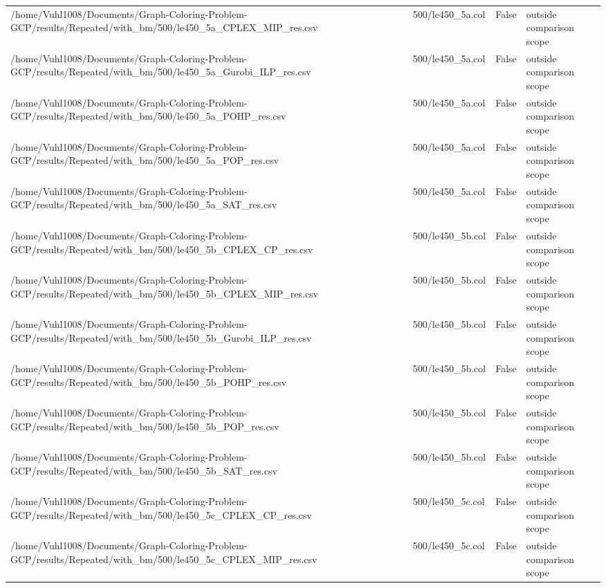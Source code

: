 \begin{table}[htbp]
\begin{tabular}{llll}
/home/Vuhl1008/Documents/Graph-Coloring-Problem-GCP/results/Repeated/with\_bm/500/le450\_5a\_CPLEX\_MIP\_res.csv & 500/le450\_5a.col & False & outside comparison scope \\
/home/Vuhl1008/Documents/Graph-Coloring-Problem-GCP/results/Repeated/with\_bm/500/le450\_5a\_Gurobi\_ILP\_res.csv & 500/le450\_5a.col & False & outside comparison scope \\
/home/Vuhl1008/Documents/Graph-Coloring-Problem-GCP/results/Repeated/with\_bm/500/le450\_5a\_POHP\_res.csv & 500/le450\_5a.col & False & outside comparison scope \\
/home/Vuhl1008/Documents/Graph-Coloring-Problem-GCP/results/Repeated/with\_bm/500/le450\_5a\_POP\_res.csv & 500/le450\_5a.col & False & outside comparison scope \\
/home/Vuhl1008/Documents/Graph-Coloring-Problem-GCP/results/Repeated/with\_bm/500/le450\_5a\_SAT\_res.csv & 500/le450\_5a.col & False & outside comparison scope \\
/home/Vuhl1008/Documents/Graph-Coloring-Problem-GCP/results/Repeated/with\_bm/500/le450\_5b\_CPLEX\_CP\_res.csv & 500/le450\_5b.col & False & outside comparison scope \\
/home/Vuhl1008/Documents/Graph-Coloring-Problem-GCP/results/Repeated/with\_bm/500/le450\_5b\_CPLEX\_MIP\_res.csv & 500/le450\_5b.col & False & outside comparison scope \\
/home/Vuhl1008/Documents/Graph-Coloring-Problem-GCP/results/Repeated/with\_bm/500/le450\_5b\_Gurobi\_ILP\_res.csv & 500/le450\_5b.col & False & outside comparison scope \\
/home/Vuhl1008/Documents/Graph-Coloring-Problem-GCP/results/Repeated/with\_bm/500/le450\_5b\_POHP\_res.csv & 500/le450\_5b.col & False & outside comparison scope \\
/home/Vuhl1008/Documents/Graph-Coloring-Problem-GCP/results/Repeated/with\_bm/500/le450\_5b\_POP\_res.csv & 500/le450\_5b.col & False & outside comparison scope \\
/home/Vuhl1008/Documents/Graph-Coloring-Problem-GCP/results/Repeated/with\_bm/500/le450\_5b\_SAT\_res.csv & 500/le450\_5b.col & False & outside comparison scope \\
/home/Vuhl1008/Documents/Graph-Coloring-Problem-GCP/results/Repeated/with\_bm/500/le450\_5c\_CPLEX\_CP\_res.csv & 500/le450\_5c.col & False & outside comparison scope \\
/home/Vuhl1008/Documents/Graph-Coloring-Problem-GCP/results/Repeated/with\_bm/500/le450\_5c\_CPLEX\_MIP\_res.csv & 500/le450\_5c.col & False & outside comparison scope \\

\end{tabular}
\end{table}
